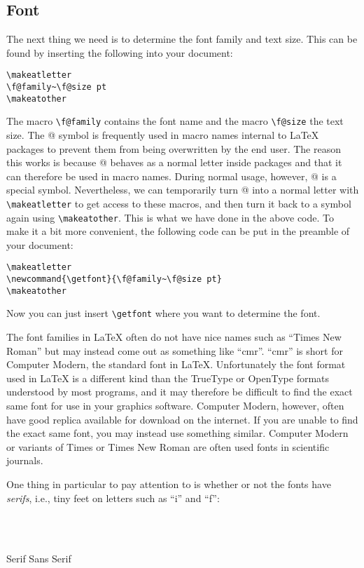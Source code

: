 \documentclass[12pt,a4paper]{article}
\makeatletter
\newcommand{\getfont}{\f@family~\f@size pt}
\makeatother
\begin{document}
\subsection{Font}
The next thing we need is to determine the font family and text size. This can be found by inserting the following into your document:
\begin{verbatim}
\makeatletter
\f@family~\f@size pt
\makeatother
\end{verbatim}
The macro \verb|\f@family| contains the font name and the macro \verb|\f@size| the text size. The @ symbol is frequently used in macro names internal to \LaTeX{} packages to prevent them from being overwritten by the end user.
The reason this works is because @ behaves as a normal letter inside packages and that it can therefore be used in macro names.
During normal usage, however, @ is a special symbol.
Nevertheless, we can temporarily turn @ into a normal letter with \verb|\makeatletter| to get access to these macros, and then turn it back to a symbol again using \verb|\makeatother|.
This is what we have done in the above code.
To make it a bit more convenient, the following code can be put in the preamble of your document:
\begin{verbatim}
\makeatletter
\newcommand{\getfont}{\f@family~\f@size pt}
\makeatother
\end{verbatim}
Now you can just insert \verb|\getfont| where you want to determine the font.

The font families in \LaTeX{} often do not have nice names such as ``Times New Roman'' but may instead come out as something like ``cmr''. ``cmr'' is short for Computer Modern, the standard font in \LaTeX{}. Unfortunately the font format used in \LaTeX{} is a different kind than the TrueType or OpenType formats understood by most programs, and it may therefore be difficult to find the exact same font for use in your graphics software. Computer Modern, however, often have good replica available for download on the internet. If you are unable to find the exact same font, you may instead use something similar. Computer Modern or variants of Times or Times New Roman are often used fonts in scientific journals.

One thing in particular to pay attention to is whether or not the fonts have \emph{serifs}, i.e., tiny feet on letters such as ``i'' and ``f'':

\\
~

{ \hfill {\Huge Serif} \hfill {\Huge \sf Sans Serif} \hfill }
\\
\end{document}
